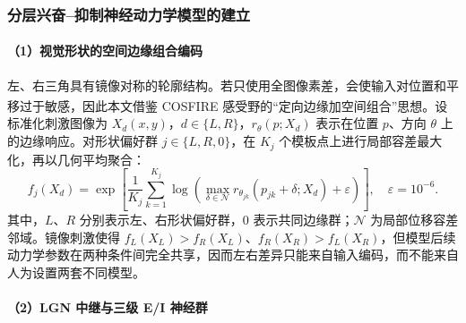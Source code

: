 \documentclass[a4paper]{ctexart}
\numberwithin{figure}{section}       %
\newcommand{\upcite}[1]{\textsuperscript{\cite{#1}}} %
\begin{document}
\subsubsection{分层兴奋--抑制神经动力学模型的建立}

\paragraph{（1）视觉形状的空间边缘组合编码}

左、右三角具有镜像对称的轮廓结构。若只使用全图像素差，会使输入对位置和平移过于敏感，因此本文借鉴 COSFIRE 感受野的“定向边缘加空间组合”思想\upcite{azzopardi2014ventral}。设标准化刺激图像为 $X_d(x,y)$，$d\in\{L,R\}$，$r_{\theta}(p;X_d)$ 表示在位置 $p$、方向 $\theta$ 上的边缘响应。对形状偏好群 $j\in\{L,R,0\}$，在 $K_j$ 个模板点上进行局部容差最大化，再以几何平均聚合：
\begin{equation}
f_j(X_d)=
\exp\!\left[
\frac{1}{K_j}\sum_{k=1}^{K_j}
\log\!\left(
\max_{\delta\in\mathcal N}
r_{\theta_{jk}}(p_{jk}+\delta;X_d)+\varepsilon
\right)\right],
\quad \varepsilon=10^{-6}.
\label{eq:q2_shape}
\end{equation}
其中，$L$、$R$ 分别表示左、右形状偏好群，$0$ 表示共同边缘群；$\mathcal N$ 为局部位移容差邻域。镜像刺激使得 $f_L(X_L)>f_R(X_L)$、$f_R(X_R)>f_L(X_R)$，但模型后续动力学参数在两种条件间完全共享，因而左右差异只能来自输入编码，而不能来自人为设置两套不同模型。

\paragraph{（2）LGN 中继与三级 E/I 神经群}
\end{document}
